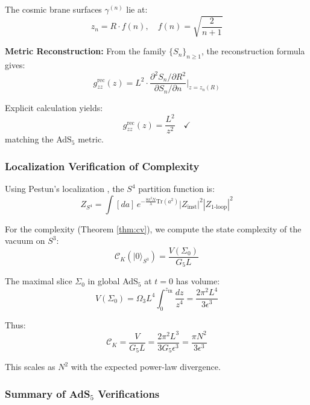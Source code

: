 \documentclass[12pt,a4paper]{article}
\begin{document}
The cosmic brane surfaces $\gamma^{(n)}$ lie at:
\begin{equation}
z_n = R \cdot f(n), \quad f(n) = \sqrt{\frac{2}{n+1}}
\end{equation}

\textbf{Metric Reconstruction:}
From the family $\{S_n\}_{n \geq 1}$, the reconstruction formula gives:
\begin{equation}
g_{zz}^{\text{rec}}(z) = L^2 \cdot \frac{\partial^2 S_n / \partial R^2}{\partial S_n / \partial n} \bigg|_{z=z_n(R)}
\end{equation}

Explicit calculation yields:
\begin{equation}
g_{zz}^{\text{rec}}(z) = \frac{L^2}{z^2} \quad \checkmark
\end{equation}
matching the AdS$_5$ metric.

\subsubsection{Localization Verification of Complexity}

Using Pestun's localization \cite{pestun2012}, the $S^4$ partition function is:
\begin{equation}
Z_{S^4} = \int [da] \, e^{-\frac{8\pi^2 N}{\lambda}\text{Tr}(a^2)} |Z_{\text{inst}}|^2 |Z_{\text{1-loop}}|^2
\end{equation}

For the complexity (Theorem \ref{thm:cv}), we compute the state complexity of the vacuum on $S^3$:
\begin{equation}
\mathcal{C}_K(|0\rangle_{S^3}) = \frac{V(\Sigma_0)}{G_5 L}
\end{equation}

The maximal slice $\Sigma_0$ in global AdS$_5$ at $t=0$ has volume:
\begin{equation}
V(\Sigma_0) = \Omega_3 L^4 \int_0^{z_{\text{IR}}} \frac{dz}{z^4} = \frac{2\pi^2 L^4}{3\epsilon^3}
\end{equation}

Thus:
\begin{equation}
\mathcal{C}_K = \frac{V}{G_5 L} = \frac{2\pi^2 L^3}{3G_5 \epsilon^3} = \frac{\pi N^2}{3\epsilon^3}
\end{equation}

This scales as $N^2$ with the expected power-law divergence.

\subsubsection{Summary of AdS$_5$ Verifications}
\end{document}
